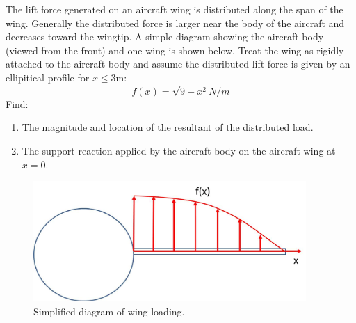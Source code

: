 
The lift force generated on an aircraft wing is distributed along the span of the wing. Generally the distributed
force is larger near the body of the aircraft and decreases toward the wingtip. A simple diagram showing the
aircraft body (viewed from the front) and one wing is shown below. Treat the wing as rigidly attached to the
aircraft body and assume the distributed lift force is given by an ellipitical profile for $x \le 3$m:
\begin{equation*}
  f(x) = \sqrt{9-x^2} N/m
\end{equation*}
Find:
\begin{enumerate}
  \item The magnitude and location of the resultant of the distributed load.
  \item The support reaction applied by the aircraft body on the aircraft wing at $x = 0$.
\end{enumerate}

\begin{figure}[ht!]
  \centering
  \includegraphics[height=1.8in]{fig.png}
  \caption*{Simplified diagram of wing loading.}
\end{figure}


